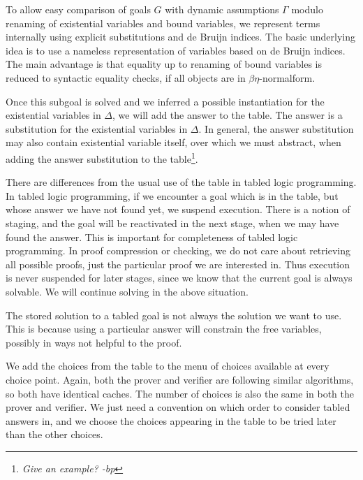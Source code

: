 \documentclass{acmconf}
\newcommand{\ednote}[1]{\footnote{\it #1}}
\begin{document}
To allow easy comparison of goals $G$ with dynamic assumptions
$\Gamma$ modulo renaming of existential variables and bound variables, we
represent terms internally using explicit substitutions
\cite{Abadi:POPL90} and de Bruijn indices. The basic underlying idea
is to use a nameless representation of variables based on de Bruijn
indices. The main advantage is that equality up to renaming
of bound variables is reduced to syntactic equality checks, if all
objects are in $\beta\eta$-normalform.

Once this subgoal is solved and we inferred a possible instantiation
for the existential variables in $\Delta$, we will add the answer to
the table. The answer is a substitution for the existential variables
in $\Delta$. In general, the answer substitution may also contain
existential variable itself, over which we must abstract, when adding
the answer substitution to the table\ednote{Give an example? -bp}.

There are differences from the usual use of the table in tabled logic
programming. In tabled logic programming, if we encounter a goal which
is in the table, but whose answer we have not found yet, we suspend
execution. There is a notion of staging, and the goal will be
reactivated in the next stage, when we may have found the answer. This
is important for completeness of tabled logic programming. In proof
compression or checking, we do not care about retrieving all possible
proofs, just the particular proof we are interested in. Thus execution
is never suspended for later stages, since we know that the current
goal is always solvable. We will continue solving in the above situation.

The stored solution to a tabled goal is not always the solution we
want to use.  This is because using a particular answer will constrain
the free variables, possibly in ways not helpful to the proof. 

We add the choices from the table to the menu of choices available at
every choice point. Again, both the prover and verifier are following
similar algorithms, so both have identical caches. The number of
choices is also the same in both the prover and verifier. We just need
a convention on which order to consider tabled answers in, and we
choose the choices appearing in the table to be tried later than the
other choices.
\end{document}
